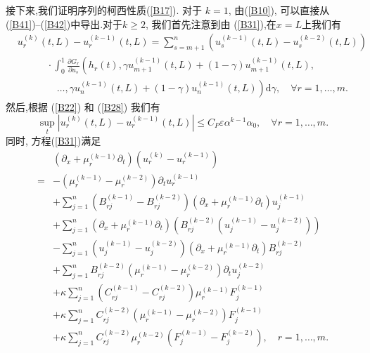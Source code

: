 \documentclass[notitlepage,cs4size,punct,oneside]{ctexrep}
\numberwithin{equation}{chapter}
\theoremstyle{mystyle}
\begin{document}
接下来,我们证明序列的柯西性质(\ref{B17}). 对于 $k=1$, 由(\ref{B10}), 可以直接从 (\ref{B41})--(\ref{B42})中导出.对于$k \geq 2$, 我们首先注意到由 (\ref{B31}),在$x=L$上我们有
\begin{align}
     & u_{r}^{(k)}(t, L)-u_{r}^{(k-1)}(t, L)= \sum_{s=m+1}^{n}\left(u_{s}^{(k-1)}(t, L)-u_{s}^{(k-2)}(t, L)\right) \nonumber                                                      \\
     & \quad \quad\quad \cdot \int_{0}^{1} \frac{\partial G_{r}}{\partial u_{s}}\left( h_{r}(t), \gamma u_{m+1}^{(k-1)}(t, L)+(1-\gamma) u_{m+1}^{(k-1)}(t, L),\right.  \nonumber \\
     & \quad \quad \quad\quad\left.\ldots, \gamma u_{n}^{(k-1)}(t, L)+(1-\gamma) u_{n}^{(k-1)}(t, L)\right) \mathrm{d} \gamma, \quad \forall r=1, \ldots, m . \label{B53}
\end{align}
然后,根据 (\ref{B22}) 和 (\ref{B28}) 我们有
\begin{equation} \label{B54}
    \sup _{t}\left|u_{r}^{(k)}(t, L)-u_{r}^{(k-1)}(t, L)\right| \leq C_{P} \varepsilon \alpha^{k-1} \alpha_{0}, \quad \forall r=1, \ldots, m .
\end{equation}
同时, 方程(\ref{B31})满足
\begin{align}
      & \left(\partial_{x}+\mu_{r}^{(k-1)} \partial_{t}\right)\left(u_{r}^{(k)}-u_{r}^{(k-1)}\right)\nonumber                                              \\
    = & -\left(\mu_{r}^{(k-1)}-\mu_{r}^{(k-2)}\right) \partial_{t} u_{r}^{(k-1)}\nonumber                                                                  \\
      & +\sum_{j=1}^{n}\left(B_{r j}^{(k-1)}-B_{r j}^{(k-2)}\right)\left(\partial_{x}+\mu_{r}^{(k-1)} \partial_{t}\right) u_{j}^{(k-1)}\nonumber           \\
      & +\sum_{j=1}^{n}\left(\partial_{x}+\mu_{r}^{(k-1)} \partial_{t}\right)\left(B_{r j}^{(k-2)}\left(u_{j}^{(k-1)}-u_{j}^{(k-2)}\right)\right)\nonumber \\
      & -\sum_{j=1}^{n}\left(u_{j}^{(k-1)}-u_{j}^{(k-2)}\right)\left(\partial_{x}+\mu_{r}^{(k-1)} \partial_{t}\right) B_{r j}^{(k-2)}\nonumber             \\
      & +\sum_{j=1}^{n} B_{r j}^{(k-2)}\left(\mu_{r}^{(k-1)}-\mu_{r}^{(k-2)}\right) \partial_{t} u_{j}^{(k-2)}\nonumber                                    \\
      & +\kappa \sum_{j=1}^{n}\left( C_{r j}^{(k-1)}-C_{r j}^{(k-2)}\right)\mu_{r}^{(k-1)}F_j^{(k-1)}\nonumber                                             \\
      & +\kappa \sum_{j=1}^{n} C_{r j}^{(k-2)}\left(\mu_{r}^{(k-1)} - \mu_{r}^{(k-2)}\right) F_j^{(k-1)}\nonumber                                          \\
      & +\kappa \sum_{j=1}^{n} C_{r j}^{(k-2)}\mu_{r}^{(k-2)} \left(F_j^{(k-1)}-F_j^{(k-2)} \right), \quad r=1, \ldots, m .\label{B55}
\end{align}
\end{document}
